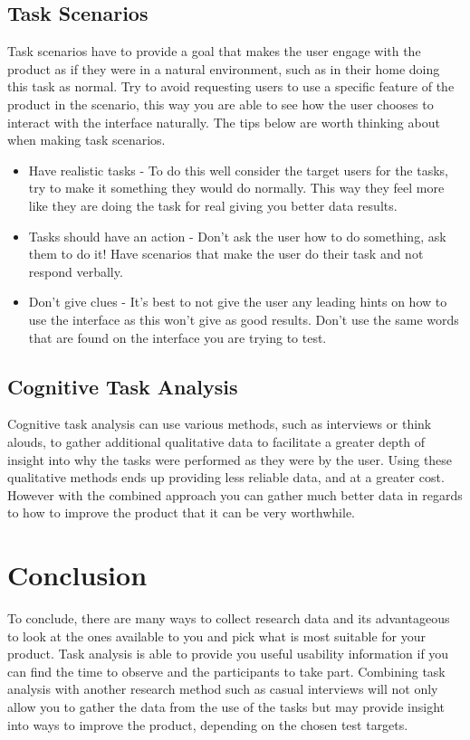 \documentclass{scrartcl}
\begin{document}
	\subsection{Task Scenarios}
		Task scenarios have to provide a goal that makes the user engage with the product as if they were in a natural environment, such as in their home doing this task as normal. Try to avoid requesting users to use a specific feature of the product in the scenario, this way you are able to see how the user chooses to interact with the interface naturally. The tips below are worth thinking about when making task scenarios.\cite{nielsen_norman_tognazzini_2018}
		\begin{itemize}
			\item Have realistic tasks - To do this well consider the target users for the tasks, try to make it something they would do normally. This way they feel more like they are doing the task for real giving you better data results.
			\item Tasks should have an action - Don't ask the user how to do something, ask them to do it! Have scenarios that make the user do their task and not respond verbally.
			\item Don't give clues - It's best to not give the user any leading hints on how to use the interface as this won't give as good results. Don't use the same words that are found on the interface you are trying to test.
		\end{itemize}	
		
		
	\subsection{Cognitive Task Analysis}
	Cognitive task analysis can use various methods, such as interviews or think alouds, to gather additional qualitative data to facilitate a greater depth of insight into why the tasks were performed as they were by the user\cite{clark2007cognitive}. Using these qualitative methods ends up providing less reliable data, and at a greater cost. However with the combined approach you can gather much better data in regards to how to improve the product that it can be very worthwhile\cite{koedinger2016closing}. 
	


	\section{Conclusion}
		To conclude, there are many ways to collect research data and its advantageous to look at the ones available to you and pick what is most suitable for your product. Task analysis is able to provide you useful usability information if you can find the time to observe and the participants to take part. Combining task analysis with another research method such as casual interviews will not only allow you to gather the data from the use of the tasks but may provide insight into ways to improve the product, depending on the chosen test targets.

	
	
	
	
\end{document}
